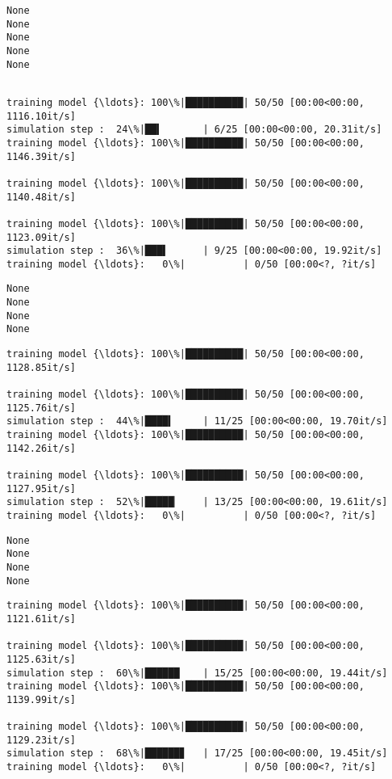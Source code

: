 \documentclass[11pt]{article}
\begin{document}
    \begin{Verbatim}[commandchars=\\\{\}]
None
None
None
None
None
    \end{Verbatim}

    \begin{Verbatim}[commandchars=\\\{\}]

training model {\ldots}: 100\%|██████████| 50/50 [00:00<00:00, 1116.10it/s]
simulation step :  24\%|██▍       | 6/25 [00:00<00:00, 20.31it/s]
training model {\ldots}: 100\%|██████████| 50/50 [00:00<00:00, 1146.39it/s]

training model {\ldots}: 100\%|██████████| 50/50 [00:00<00:00, 1140.48it/s]

training model {\ldots}: 100\%|██████████| 50/50 [00:00<00:00, 1123.09it/s]
simulation step :  36\%|███▌      | 9/25 [00:00<00:00, 19.92it/s]
training model {\ldots}:   0\%|          | 0/50 [00:00<?, ?it/s]
    \end{Verbatim}

    \begin{Verbatim}[commandchars=\\\{\}]
None
None
None
None
    \end{Verbatim}

    \begin{Verbatim}[commandchars=\\\{\}]
training model {\ldots}: 100\%|██████████| 50/50 [00:00<00:00, 1128.85it/s]

training model {\ldots}: 100\%|██████████| 50/50 [00:00<00:00, 1125.76it/s]
simulation step :  44\%|████▍     | 11/25 [00:00<00:00, 19.70it/s]
training model {\ldots}: 100\%|██████████| 50/50 [00:00<00:00, 1142.26it/s]

training model {\ldots}: 100\%|██████████| 50/50 [00:00<00:00, 1127.95it/s]
simulation step :  52\%|█████▏    | 13/25 [00:00<00:00, 19.61it/s]
training model {\ldots}:   0\%|          | 0/50 [00:00<?, ?it/s]
    \end{Verbatim}

    \begin{Verbatim}[commandchars=\\\{\}]
None
None
None
None
    \end{Verbatim}

    \begin{Verbatim}[commandchars=\\\{\}]
training model {\ldots}: 100\%|██████████| 50/50 [00:00<00:00, 1121.61it/s]

training model {\ldots}: 100\%|██████████| 50/50 [00:00<00:00, 1125.63it/s]
simulation step :  60\%|██████    | 15/25 [00:00<00:00, 19.44it/s]
training model {\ldots}: 100\%|██████████| 50/50 [00:00<00:00, 1139.99it/s]

training model {\ldots}: 100\%|██████████| 50/50 [00:00<00:00, 1129.23it/s]
simulation step :  68\%|██████▊   | 17/25 [00:00<00:00, 19.45it/s]
training model {\ldots}:   0\%|          | 0/50 [00:00<?, ?it/s]
    \end{Verbatim}
\end{document}

